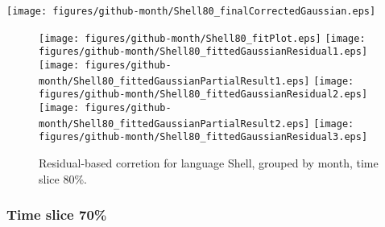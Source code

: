 \begin{center}
{\texttt{[image: figures/github-month/Shell80\_finalCorrectedGaussian.eps]}}
\end{center}

\FloatBarrier

\begin{figure}[t]
\centering
{}
{\texttt{[image: figures/github-month/Shell80\_fitPlot.eps]}}
{\texttt{[image: figures/github-month/Shell80\_fittedGaussianResidual1.eps]}}
{\texttt{[image: figures/github-month/Shell80\_fittedGaussianPartialResult1.eps]}}
{\texttt{[image: figures/github-month/Shell80\_fittedGaussianResidual2.eps]}}
{\texttt{[image: figures/github-month/Shell80\_fittedGaussianPartialResult2.eps]}}
{\texttt{[image: figures/github-month/Shell80\_fittedGaussianResidual3.eps]}}
\caption{Residual-based corretion for language Shell, grouped by month, time slice 80\%.}
\end{figure}


\FloatBarrier


\subsubsection{Time slice 70\%}

